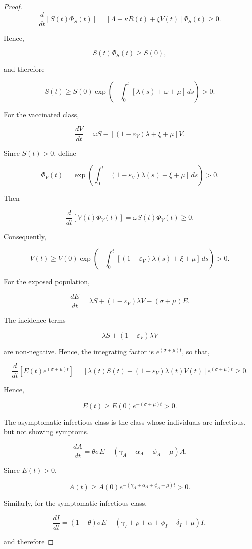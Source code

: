 \documentclass[12pt,a4paper]{article}
\theoremstyle{definition}
\theoremstyle{remark}
\begin{document}
\begin{proof}
$$
\frac{d}{dt}\left[S(t)\Phi_S(t)\right]
=
\left[\Lambda+\kappa R(t)+\xi V(t)\right]\Phi_S(t)
\geq0.
$$

Hence,

$$
S(t)\Phi_S(t)\geq S(0),
$$

and therefore

$$
S(t)\geq
S(0)\exp\left(
-\int_0^t[\lambda(s)+\omega+\mu]\,ds
\right)>0.
$$

For the vaccinated class,

$$
\frac{dV}{dt}
=
\omega S-\left[(1-\varepsilon_V)\lambda+\xi+\mu\right]V.
$$

Since $S(t)>0$, define

$$
\Phi_V(t)
=
\exp\left(
\int_0^t
[(1-\varepsilon_V)\lambda(s)+\xi+\mu]\,ds
\right)>0.
$$

Then

$$
\frac{d}{dt}\left[V(t)\Phi_V(t)\right]
=
\omega S(t)\Phi_V(t)\geq0.
$$

Consequently,

$$
V(t)\geq
V(0)\exp\left(
-\int_0^t
[(1-\varepsilon_V)\lambda(s)+\xi+\mu]\,ds
\right)>0.
$$

For the exposed population,

$$
\frac{dE}{dt}
=
\lambda S+(1-\varepsilon_V)\lambda V-(\sigma+\mu)E.
$$

The incidence terms

$$
\lambda S+(1-\varepsilon_V)\lambda V
$$

are non-negative. Hence, the integrating factor is $e^{(\sigma+\mu)t}$, so that,

$$
\frac{d}{dt}
\left[E(t)e^{(\sigma+\mu)t}\right]
=
\left[
\lambda(t)S(t)
+
(1-\varepsilon_V)\lambda(t)V(t)
\right]
e^{(\sigma+\mu)t}
\geq0.
$$

Hence,

$$
E(t)\geq E(0)e^{-(\sigma+\mu)t}>0.
$$

The asymptomatic infectious class is the class whose individuals are infectious, but not showing symptoms.

$$
\frac{dA}{dt}
=
\theta\sigma E
-
(\gamma_A+\alpha_A+\phi_A+\mu)A.
$$

Since $E(t)>0$,

$$
A(t)\geq
A(0)
e^{-(\gamma_A+\alpha_A+\phi_A+\mu)t}>0.
$$

Similarly, for the symptomatic infectious class,

$$
\frac{dI}{dt}
=
(1-\theta)\sigma E
-
(\gamma_I+\rho+\alpha+\phi_I+\delta_I+\mu)I,
$$

and therefore


\end{proof}
\end{document}
